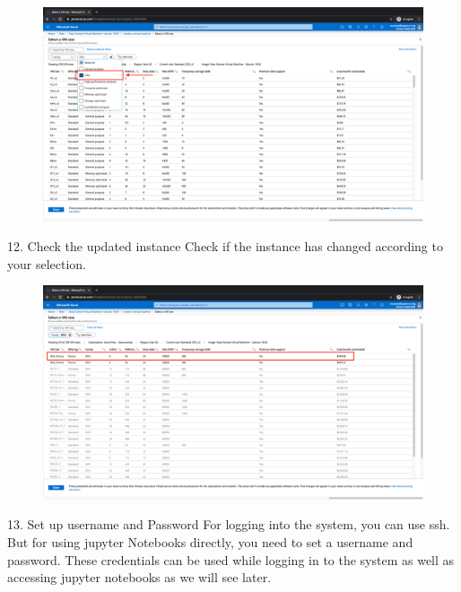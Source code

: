 \begin{figure}[H]
\begin{center} 
\includegraphics[scale=0.20]{figures/vm12}
\end{center}
\end{figure}

12. Check the updated instance
Check if the instance has changed according to your selection.

\begin{figure}[H]
\begin{center} 
\includegraphics[scale=0.20]{figures/vm13}
\end{center}
\end{figure}

13. Set up username and Password
For logging into the system, you can use ssh. But for using jupyter Notebooks directly, you need to set a username and password. These credentials can be used while logging in to the system as well as accessing jupyter notebooks as we will see later.

